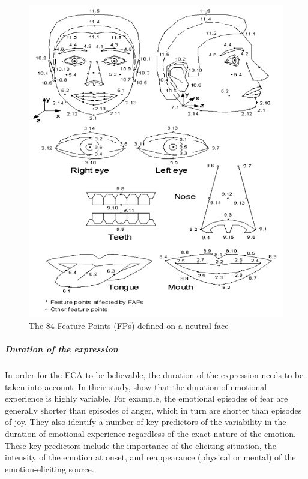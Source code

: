 \documentclass[11pt]{article}
\begin{document}
\begin{figure}
   	\centerline{\includegraphics[scale=0.5]{./images/mpeg4}}
   	\caption{\label{Figure FAPs} The 84 Feature Points (FPs) defined on a neutral face \citep{Pandzic03}}
\end{figure}
\clearpage
\subparagraph{Duration of the expression}
In order for the ECA to be believable, the duration of the expression needs to be taken into account. In their study, \citeauthor{Verduyn09} show that the duration of emotional experience is highly variable. For example, the emotional episodes of fear are generally shorter than episodes of anger, which in turn are shorter than episodes of joy. They also identify a number of key predictors of the variability in the duration of emotional experience regardless of the exact nature of the emotion. These key predictors include the importance of the eliciting situation, the intensity of the emotion at onset, and reappearance (physical or mental) of the emotion-eliciting source.\\
\end{document}
